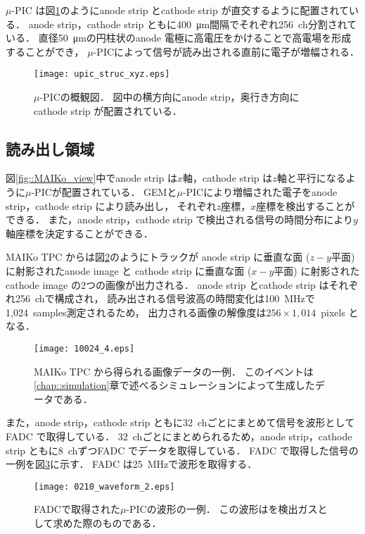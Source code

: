 \documentclass[../master]{subfiles}
\begin{document}
$\mu$-PIC は図\ref{fig::mupic}のようにanode strip とcathode strip が直交するように配置されている．
anode strip，cathode strip ともに\SI{400}{\micro\metre}間隔でそれぞれ256~ch分割されている．
直径\SI{50}{\micro\metre}の円柱状のanode 電極に高電圧をかけることで高電場を形成することができ，
$\mu$-PICによって信号が読み出される直前に電子が増幅される．
\begin{figure}
  \centering
  \texttt{[image: upic\_struc\_xyz.eps]}
  \caption[$\mu$-PICの概観図．]{$\mu$-PICの概観図．
    図中の横方向にanode strip，奥行き方向にcathode strip が配置されている．
  }
  \label{fig::mupic}
\end{figure}

\subsection{読み出し領域}
\label{sec::mu-pic}
図\ref{fig::MAIKo_view}中でanode strip は$x$軸，cathode strip は$z$軸と平行になるように$\mu$-PICが配置されている．
GEMと$\mu$-PICにより増幅された電子をanode strip，cathode strip により読み出し，
それぞれ$z$座標，$x$座標を検出することができる．
また，anode strip，cathode strip で検出される信号の時間分布により$y$軸座標を決定することができる．

MAIKo TPC からは図\ref{fig::track_demo}のようにトラックが
anode strip に垂直な面 ($z-y$平面) に射影されたanode image と
cathode strip に垂直な面 ($x-y$平面) に射影されたcathode image の2つの画像が出力される．
anode strip とcathode strip はそれぞれ256~chで構成され，
読み出される信号波高の時間変化は\SI{100}{\mega\hertz}で1,024~samples測定されるため，
出力される画像の解像度は$256\times1,014$~pixels となる．
\begin{figure}
  \centering
  \texttt{[image: 10024\_4.eps]}
  \caption[MAIKo TPC から得られる画像データの一例．]
          {MAIKo TPC から得られる画像データの一例．
          このイベントは\ref{chap::simulation}章で述べるシミュレーションによって生成したデータである．}
  \label{fig::track_demo}
\end{figure}
また，anode strip，cathode strip ともに32~chごとにまとめて信号を波形としてFADC で取得している．
32~chごとにまとめられるため，anode strip，cathode strip ともに8~chずつFADC でデータを取得している．
FADC で取得した信号の一例を図\ref{fig::FADC_waveform}に示す．
FADC は\SI{25}{\mega\hertz}で波形を取得する．
\begin{figure}
  \centering
  \texttt{[image: 0210\_waveform\_2.eps]}
  \caption[FADCで取得された$\mu$-PICの波形の一例．]
          {FADCで取得された$\mu$-PICの波形の一例．
          この波形は\isoButaneHydro を検出ガスとして求めた際のものである．}
  \label{fig::FADC_waveform}
\end{figure}
\end{document}

